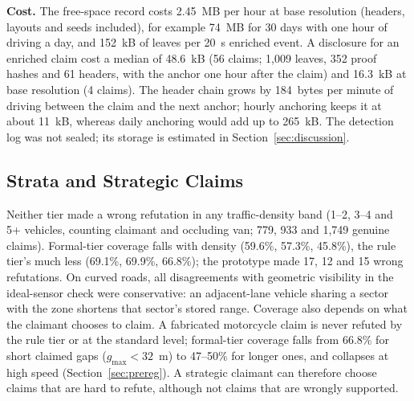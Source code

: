 \textbf{Cost.} The free-space record costs 2.45~MB per hour at base resolution (headers, layouts and seeds included), for example 74~MB for 30 days with one hour of driving a day, and 152~kB of leaves per 20~s enriched event. A disclosure for an enriched claim cost a median of 48.6~kB (56 claims; 1,009 leaves, 352 proof hashes and 61 headers, with the anchor one hour after the claim) and 16.3~kB at base resolution (4 claims). The header chain grows by 184~bytes per minute of driving between the claim and the next anchor; hourly anchoring keeps it at about 11~kB, whereas daily anchoring would add up to 265~kB. The detection log was not sealed; its storage is estimated in Section~\ref{sec:discussion}.

\subsection{Strata and Strategic Claims}\label{sec:strata}
Neither tier made a wrong refutation in any traffic-density band (1--2, 3--4 and 5+ vehicles, counting claimant and occluding van; 779, 933 and 1,749 genuine claims). Formal-tier coverage falls with density (59.6\%, 57.3\%, 45.8\%), the rule tier's much less (69.1\%, 69.9\%, 66.8\%); the prototype made 17, 12 and 15 wrong refutations. On curved roads, all disagreements with geometric visibility in the ideal-sensor check were conservative: an adjacent-lane vehicle sharing a sector with the zone shortens that sector's stored range. Coverage also depends on what the claimant chooses to claim. A fabricated motorcycle claim is never refuted by the rule tier or at the standard level; formal-tier coverage falls from 66.8\% for short claimed gaps ($g_{\max} < 32$~m) to 47--50\% for longer ones, and collapses at high speed (Section~\ref{sec:prereg}). A strategic claimant can therefore choose claims that are hard to refute, although not claims that are wrongly supported.

